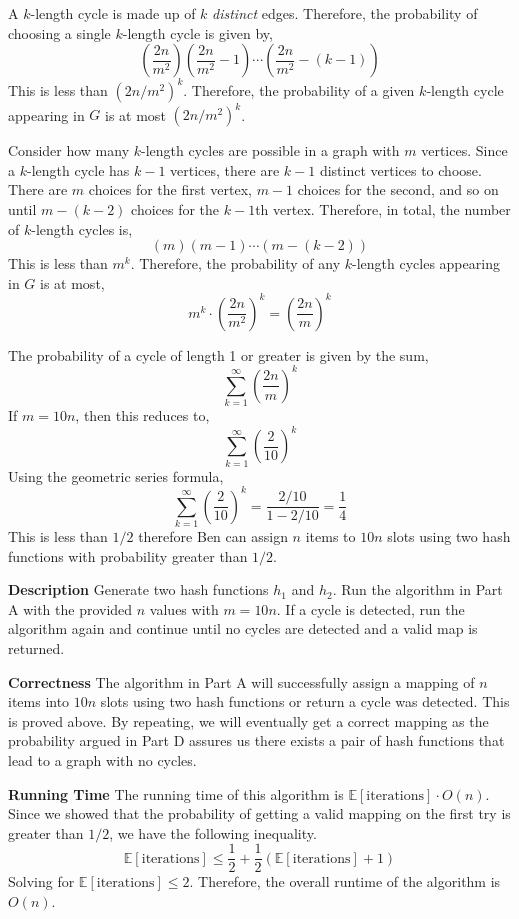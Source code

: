 \documentclass[12pt,twoside]{article}
\begin{document}
\begin{problems}
\begin{problemparts}
A $k$-length cycle is made up of $k$ {\it distinct} edges. Therefore, the
probability of choosing a single $k$-length cycle is given by,
$$ \left(\frac{2n}{m^2}\right) \left(\frac{2n}{m^2} - 1\right) \cdots
\left(\frac{2n}{m^2} - (k - 1)\right) $$
This is less than $\left(2n / m^2\right)^k$. Therefore, the probability of a
given $k$-length cycle appearing in $G$ is at most $\left(2n / m^2\right)^k$.

\problempart %

Consider how many $k$-length cycles are possible in a graph with $m$
vertices. Since a $k$-length cycle has $k - 1$ vertices, there are $k - 1$
distinct vertices to choose. There are $m$ choices for the first vertex, $m -
1$ choices for the second, and so on until $m - (k - 2)$ choices for the $k -
1$th vertex. Therefore, in total, the number of $k$-length cycles is,
$$ (m) (m - 1) \cdots (m - (k - 2)) $$
This is less than $m^k$. Therefore, the probability of any $k$-length cycles
appearing in $G$ is at most,
$$ m^k \cdot \left(\frac{2n}{m^2}\right)^k = \left(\frac{2n}{m}\right)^k $$

\problempart %

The probability of a cycle of length 1 or greater is given by the sum,
$$ \sum_{k = 1}^\infty \left(\frac{2n}{m}\right)^k $$
If $m = 10n$, then this reduces to,
$$ \sum_{k = 1}^\infty \left(\frac{2}{10}\right)^k $$
Using the geometric series formula,
$$ \sum_{k = 1}^\infty \left(\frac{2}{10}\right)^k = \frac{2/10}{1 - 2/10} =
\frac{1}{4} $$
This is less than $1/2$ therefore Ben can assign $n$ items to $10n$ slots
using two hash functions with probability greater than $1/2$.

\problempart %

{\bf Description} Generate two hash functions $h_1$ and $h_2$. Run the
algorithm in Part A with the provided $n$ values with $m = 10n$. If a cycle
is detected, run the algorithm again and continue until no cycles are
detected and a valid map is returned.

{\bf Correctness} The algorithm in Part A will successfully assign a mapping
of $n$ items into $10n$ slots using two hash functions or return a cycle was
detected. This is proved above. By repeating, we will eventually get a
correct mapping as the probability argued in Part D assures us there exists a
pair of hash functions that lead to a graph with no cycles.

{\bf Running Time} The running time of this algorithm is
$\mathbb{E}[\mathrm{iterations}] \cdot O(n)$. Since we showed that the
probability of getting a valid mapping on the first try is greater than
$1/2$, we have the following inequality.
$$ \mathbb{E}[\mathrm{iterations}] \leq \frac{1}{2} +
\frac{1}{2}\left(\mathbb{E}[\mathrm{iterations}] + 1\right) $$
Solving for $\mathbb{E}[\mathrm{iterations}] \leq 2 $. Therefore, the overall
runtime of the algorithm is $O(n)$.


\end{problemparts}
\end{problems}
\end{document}
